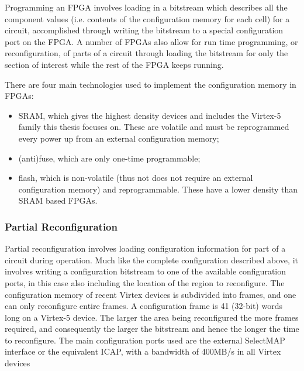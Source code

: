 \documentclass[12pt,final,oneside]{dwThesis} %
\begin{document}
   Programming an \gls{FPGA} involves loading in a bitstream which describes all the component values (i.e. contents of the configuration memory for each cell) for a circuit, accomplished through writing the bitstream to a special configuration port on the \gls{FPGA}. A number of \glspl{FPGA} also allow for run time programming, or reconfiguration, of parts of a circuit through loading the bitstream for only the section of interest while the rest of the \gls{FPGA} keeps running.

   There are four main technologies used to implement the configuration memory in \glspl{FPGA}:
   \begin{itemize}
      \item \gls{SRAM}, which gives the highest density devices and includes the Virtex-5 family this thesis focuses on. These are volatile and must be reprogrammed every power up from an external configuration memory;
      \item (anti)fuse, which are only one-time programmable;
      \item flash, which is non-volatile (thus not does not require an external configuration memory) and reprogrammable. These have a lower density than \gls{SRAM} based \glspl{FPGA}\cite{FPGAArch}.
   \end{itemize}
   \subsubsection{Partial Reconfiguration}
   Partial reconfiguration involves loading configuration information for part of a circuit during operation. Much like the complete configuration described above, it involves writing a configuration bitstream to one of the available configuration ports, in this case also including the location of the region to reconfigure. The configuration memory of recent Virtex devices is subdivided into frames, and one can only reconfigure entire frames. A configuration frame is 41 (32-bit) words long on a Virtex-5 device. The larger the area being reconfigured the more frames required, and consequently the larger the bitstream and hence the longer the time to reconfigure. The main configuration ports used are the external SelectMAP interface or the equivalent \gls{ICAP}, with a bandwidth of 400MB/s in all Virtex devices \cite{XCell33,DiesselChange}
\end{document}
